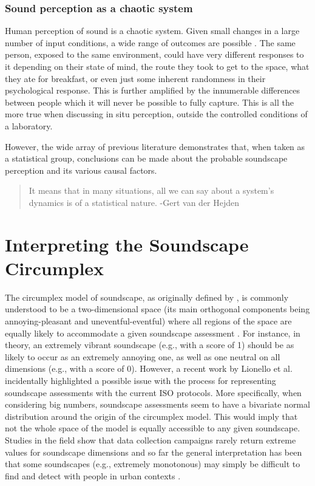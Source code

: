 
\subsubsection{Sound perception as a chaotic system}

Human perception of sound is a chaotic system. Given small changes in a large number of input conditions, a wide range of outcomes are possible . The same person, exposed to the same environment, could have very different responses to it depending on their state of mind, the route they took to get to the space, what they ate for breakfast, or even just some inherent randomness in their psychological response. This is further amplified by the innumerable differences between people which it will never be possible to fully capture. This is all the more true when discussing in situ perception, outside the controlled conditions of a laboratory.

However, the wide array of previous literature demonstrates that, when taken as a statistical group, conclusions can be made about the probable soundscape perception and its various causal factors.

\begin{quote}
  It means that in many situations, all we can say about a system's dynamics is of a statistical nature. -Gert van der Hejden
\end{quote}

\section{Interpreting the Soundscape Circumplex}
The circumplex model of soundscape, as originally defined by \citet{Axelsson2010principal}, is commonly understood to be a two-dimensional space (its main orthogonal components being annoying-pleasant and uneventful-eventful) where all regions of the space are equally likely to accommodate a given soundscape assessment \citep{Aletta2016Soundscape}. For instance, in theory, an extremely vibrant soundscape (e.g., with a score of 1) should be as likely to occur as an extremely annoying one, as well as one neutral on all dimensions (e.g., with a score of 0). However, a recent work by Lionello et al. \citep{Lionello2021Introducing} incidentally highlighted a possible issue with the process for representing soundscape assessments with the current ISO protocols. More specifically, when considering big numbers, soundscape assessments seem to have a bivariate normal distribution around the origin of the circumplex model. This would imply that not the whole space of the model is equally accessible to any given soundscape. Studies in the field show that data collection campaigns rarely return extreme values for soundscape dimensions \citep{Mancini2021Soundwalk} and so far the general interpretation has been that some soundscapes (e.g., extremely monotonous) may simply be difficult to find and detect with people in urban contexts \citep{Sun2019Classification}.

